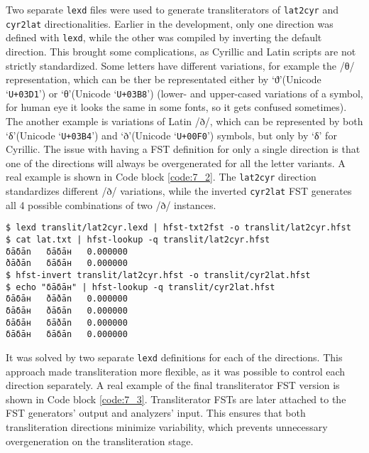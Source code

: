 Two separate \texttt{lexd} files were used to generate transliterators of \texttt{lat2cyr} and \texttt{cyr2lat} directionalities. Earlier in the development, only one direction was defined with \texttt{lexd}, while the other was compiled by inverting the default direction. This brought some complications, as Cyrillic and Latin scripts are not strictly standardized. Some letters have different variations, for example the /θ/ representation, which can be ther be representated either by `ϑ'(Unicode `\texttt{U+03D1}') or `θ'(Unicode `\texttt{U+03B8}') (lower- and upper-cased variations of a symbol, for human eye it looks the same in some fonts, so it gets confused sometimes). The another example is variations of Latin /ð/, which can be represented by both `δ'(Unicode `\texttt{U+03B4}') and `ð'(Unicode `\texttt{U+00F0}') symbols, but only by `δ' for Cyrillic. The issue with having a FST definition for only a single direction is that one of the directions will always be overgenerated for all the letter variants. A real example is shown in Code block \ref{code:7_2}. The \texttt{lat2cyr} direction standardizes different /ð/ variations, while the inverted \texttt{cyr2lat} FST generates all 4 possible combinations of two /ð/ instances.

\begin{code_frame}[float]
    \begin{footnotesize}\codespacing
    \begin{verbatim}
$ lexd translit/lat2cyr.lexd | hfst-txt2fst -o translit/lat2cyr.hfst
$ cat lat.txt | hfst-lookup -q translit/lat2cyr.hfst
δāδān   δāδāн   0.000000
ðāðān   δāδāн   0.000000
$ hfst-invert translit/lat2cyr.hfst -o translit/cyr2lat.hfst
$ echo "δāδāн" | hfst-lookup -q translit/cyr2lat.hfst
δāδāн   ðāðān   0.000000
δāδāн   ðāδān   0.000000
δāδāн   δāðān   0.000000
δāδāн   δāδān   0.000000
    \end{verbatim}
    \end{footnotesize}
    \tcblower
    \label{code:7_2}
\end{code_frame}

It was solved by two separate \texttt{lexd} definitions for each of the directions. This approach made transliteration more flexible, as it was possible to control each direction separately. A real example of the final transliterator FST version is shown in Code block \ref{code:7_3}. Transliterator FSTs are later attached to the FST generators' output and analyzers' input. This ensures that both transliteration directions minimize variability, which prevents unnecessary overgeneration on the transliteration stage.

